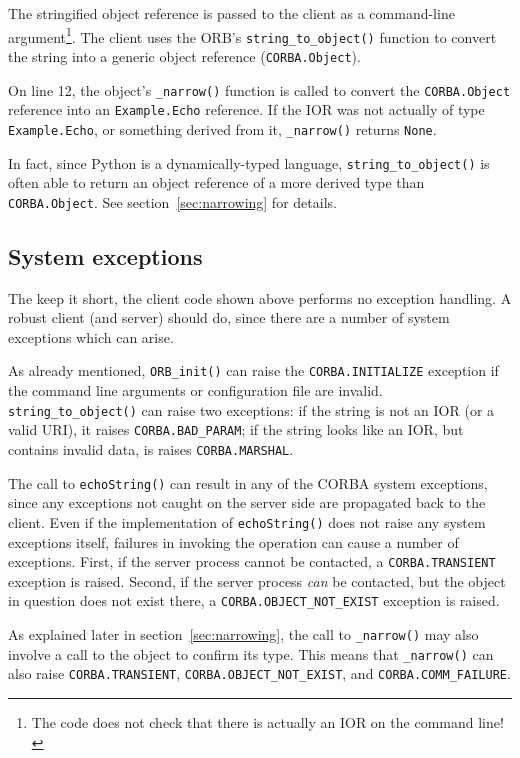 \documentclass[11pt,oneside,a4paper]{book}
\newcommand{\type}[1]{\texttt{#1}}
\newcommand{\code}[1]{\texttt{#1}}
\newcommand{\op}[1]{\texttt{#1()}}
\newcommand{\dsc}{\discretionary{}{}{}}
\begin{document}
The stringified object reference is passed to the client as a
command-line argument\footnote{The code does not check that there is
actually an IOR on the command line!}. The client uses the ORB's
\op{string\_to\_object} function to convert the string into a generic
object reference (\type{CORBA.Object}).

On line 12, the object's \op{\_narrow} function is called to convert
the \type{CORBA.\dsc{}Object} reference into an \type{Example.Echo}
reference. If the IOR was not actually of type \type{Example.Echo}, or
something derived from it, \op{\_narrow} returns \code{None}.

In fact, since Python is a dynamically-typed language,
\op{string\_to\_object} is often able to return an object reference of
a more derived type than \type{CORBA.\dsc{}Object}. See
section~\ref{sec:narrowing} for details.

\vspace{\baselineskip}%


\subsection{System exceptions}

The keep it short, the client code shown above performs no exception
handling. A robust client (and server) should do, since there are a
number of system exceptions which can arise.

As already mentioned, \op{ORB\_init} can raise the
\code{CORBA.INITIALIZE} exception if the command line arguments or
configuration file are invalid.  \op{string\_to\_\dsc{}object} can
raise two exceptions: if the string is not an IOR (or a valid URI), it
raises \code{CORBA.BAD\_PARAM}; if the string looks like an IOR, but
contains invalid data, is raises \code{CORBA.MARSHAL}.

The call to \op{echoString} can result in any of the CORBA system
exceptions, since any exceptions not caught on the server side are
propagated back to the client. Even if the implementation of
\op{echoString} does not raise any system exceptions itself, failures
in invoking the operation can cause a number of exceptions. First, if
the server process cannot be contacted, a \code{CORBA.TRANSIENT}
exception is raised. Second, if the server process \emph{can} be
contacted, but the object in question does not exist there, a
\code{CORBA.OBJECT\_NOT\_EXIST} exception is raised.

As explained later in section~\ref{sec:narrowing}, the call to
\op{\_narrow} may also involve a call to the object to confirm its
type. This means that \op{\_narrow} can also raise
\code{CORBA.TRANSIENT}, \code{CORBA.OBJECT\_NOT\_EXIST}, and
\code{CORBA.COMM\_FAILURE}.
\end{document}
